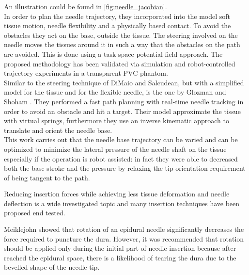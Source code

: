 An illustration could be found in \figurename{ \ref{fig:needle_jacobian}}.\\
In order to plan the needle trajectory, they incorporated into the model soft tissue motion, needle flexibility and a physically based contact. To avoid the obstacles they act on the base, outside the tissue. The steering involved on the needle moves the tissues around it in such a way that the obstacles on the path are avoided. This is done using a task space potential field approach. The proposed methodology has been validated via simulation and robot-controlled trajectory experiments in a transparent PVC phantom.\\

Similar to the steering technique of DiMaio and Salcudean, but with a simplified model for the tissue and for the flexible needle, is the one by Glozman and Shoham \cite{Glozman2006}.
They performed a fast path planning with real-time needle tracking in order to avoid an obstacle and hit a target.
Their model approximate the tissue with virtual springs, furthermore they use an inverse kinematic approach to translate and orient the needle base.\\
This work carries out that the needle base trajectory can be varied and can be optimized to minimize the lateral pressure of the needle shaft on the tissue especially if the operation is robot assisted: in fact they were able to decreased both the base stroke and the pressure by relaxing the tip orientation requirement of being tangent to the path.

Reducing insertion forces while achieving less tissue deformation and needle deflection is a wide investigated topic and many insertion techniques have been proposed end tested.
 
Meiklejohn \cite{MEIKLEJOHN1987} showed that rotation of an epidural needle significantly decreases the force required to puncture the dura. However, it was recommended that rotation should be applied only during the initial part of needle insertion because after reached the epidural space, there is a likelihood of tearing the dura due to the bevelled shape of the needle tip.

